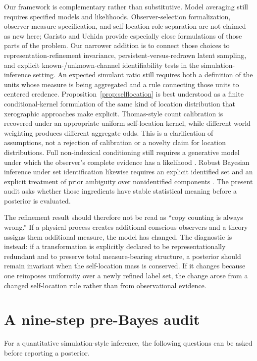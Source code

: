\documentclass[11pt]{article}
\begin{document}
Our framework is complementary rather than substitutive. Model averaging still requires specified models and likelihoods. Observer-selection formalization, observer-measure specification, and self-location-role separation are not claimed as new here; Garisto and Uchida provide especially close formulations of those parts of the problem. Our narrower addition is to connect those choices to representation-refinement invariance, persistent-versus-redrawn latent sampling, and explicit known-/unknown-channel identifiability tests in the simulation-inference setting. An expected simulant ratio still requires both a definition of the units whose measure is being aggregated and a rule connecting those units to centered credence. Proposition~\ref{prop:selflocation} is best understood as a finite conditional-kernel formulation of the same kind of location distribution that xerographic approaches make explicit. Thomas-style count calibration is recovered under an appropriate uniform self-location kernel, while different world weighting produces different aggregate odds. This is a clarification of assumptions, not a rejection of calibration or a novelty claim for location distributions. Full non-indexical conditioning still requires a generative model under which the observer's complete evidence has a likelihood \citep{neal2006}. Robust Bayesian inference under set identification likewise requires an explicit identified set and an explicit treatment of prior ambiguity over nonidentified components \citep{giacomini2021}. The present audit asks whether those ingredients have stable statistical meaning before a posterior is evaluated.

The refinement result should therefore not be read as ``copy counting is always wrong.'' If a physical process creates additional conscious observers and a theory assigns them additional measure, the model has changed. The diagnostic is instead: if a transformation is explicitly declared to be representationally redundant and to preserve total measure-bearing structure, a posterior should remain invariant when the self-location mass is conserved. If it changes because one reimposes uniformity over a newly refined label set, the change arose from a changed self-location rule rather than from observational evidence.

\section{A nine-step pre-Bayes audit}
For a quantitative simulation-style inference, the following questions can be asked before reporting a posterior.
\end{document}

